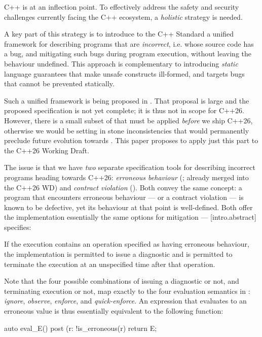 C++ is at an inflection point. To effectively address the safety and security challenges currently facing the C++ ecosystem, a \emph{holistic} strategy is needed.

A key part of this strategy is to introduce to the C++ Standard a unified framework for describing programs that are \emph{incorrect}, i.e. whose source code has a bug, and mitigating such bugs during program execution, without leaving the behaviour undefined. This approach is complementary to introducing \emph{static} language guarantees that make unsafe constructs ill-formed, and targets bugs that cannot be prevented statically.

Such a unified framework is being proposed in \cite{P3100R1}. That proposal is large and the proposed specification is not yet complete; it is thus not in scope for C++26. However, there is a small subset of \cite{P3100R1} that must be applied \emph{before} we ship C++26, otherwise we would be setting in stone inconsistencies that would permanently preclude future evolution towards \cite{P3100R1}. This paper proposes to apply just this part to the C++26 Working Draft.

The issue is that we have \emph{two} separate specification tools for describing incorrect programs heading towards C++26: \emph{erroneous behaviour} (\cite{P2795R5}; already merged into the C++26 WD) and \emph{contract violation} (\cite{P2900R13}). Both convey the same concept: a program that encounters erroneous behaviour --- or a contract violation --- is known to be defective, yet its behaviour at that point is well-defined. Both offer the implementation essentially the same options for mitigation --- [intro.abstract] specifies:
\begin{adjustwidth}{0.5cm}{0.5cm}
If the execution contains an operation specified as having erroneous behaviour, the implementation is permitted to issue a diagnostic and is permitted to terminate the execution at an unspecified time after that operation.
\end{adjustwidth}
Note that the four possible combinations of issuing a diagnostic or not, and terminating execution or not, map exactly to the four evaluation semantics in \cite{P2900R13}: \emph{ignore}, \emph{observe}, \emph{enforce}, and \emph{quick-enforce}. An expression  that evaluates to an erroneous value is thus essentially equivalent to the following function:

\begin{codeblock}
auto eval_E() 
post (r: !is_erroneous(r) { 
  return E;
}
\end{codeblock}

